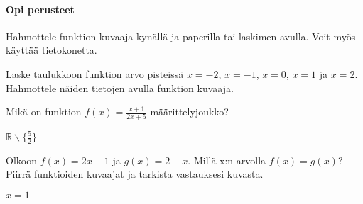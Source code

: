 \begin{tehtavasivu}

\paragraph*{Opi perusteet}

\begin{tehtava}
Hahmottele funktion kuvaaja kynällä ja paperilla tai laskimen avulla. Voit myös käyttää tietokonetta.
\begin{alakohdat}
\end{alakohdat}

\end{tehtava}

\begin{tehtava}
  Laske taulukkoon funktion arvo pisteissä $x=-2$, $x=-1$, $x=0$, $x=1$ ja $x=2$. Hahmottele näiden tietojen avulla funktion kuvaaja.
  \begin{alakohdat}
  \end{alakohdat}

  \begin{vastaus}
    \begin{alakohdat}
    \end{alakohdat}
  \end{vastaus}
\end{tehtava}

\begin{tehtava} %
  Mikä on funktion $f(x)=\frac{x+1}{2x+5}$ määrittelyjoukko?

  \begin{vastaus}
   $\mathbb{R} \backslash \lbrace \frac{5}{2} \rbrace$
  \end{vastaus}

\end{tehtava}

\begin{tehtava} %
	Olkoon $f(x) = 2x-1$ ja $g(x) = 2-x$. Millä x:n arvolla $f(x) = g(x)$? Piirrä funktioiden kuvaajat ja tarkista vastauksesi kuvasta.
    \begin{vastaus}
    $ x = 1 $
    \end{vastaus}
\end{tehtava}


\end{tehtavasivu}
